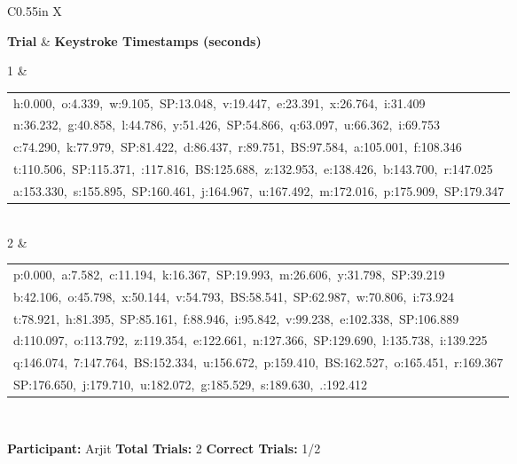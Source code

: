 \documentclass[10pt,a4paper]{article}
\begin{document}
\begin{center}
\begin{tabularx}{\textwidth}{
    C{0.55in}
    X
}
\toprule

\textbf{Trial} &
\textbf{Keystroke Timestamps (seconds)}
\\

\midrule

1 &
\begin{tabular}[t]{@{}l@{}}
h:0.000,\ o:4.339,\ w:9.105,\ SP:13.048,\ v:19.447,\ e:23.391,\ x:26.764,\ i:31.409\\
n:36.232,\ g:40.858,\ l:44.786,\ y:51.426,\ SP:54.866,\ q:63.097,\ u:66.362,\ i:69.753\\
c:74.290,\ k:77.979,\ SP:81.422,\ d:86.437,\ r:89.751,\ BS:97.584,\ a:105.001,\ f:108.346\\
t:110.506,\ SP:115.371,\ 
:117.816,\ BS:125.688,\ z:132.953,\ e:138.426,\ b:143.700,\ r:147.025\\
a:153.330,\ s:155.895,\ SP:160.461,\ j:164.967,\ u:167.492,\ m:172.016,\ p:175.909,\ SP:179.347
\end{tabular}
\\[0.12cm]

2 &
\begin{tabular}[t]{@{}l@{}}
p:0.000,\ a:7.582,\ c:11.194,\ k:16.367,\ SP:19.993,\ m:26.606,\ y:31.798,\ SP:39.219\\
b:42.106,\ o:45.798,\ x:50.144,\ v:54.793,\ BS:58.541,\ SP:62.987,\ w:70.806,\ i:73.924\\
t:78.921,\ h:81.395,\ SP:85.161,\ f:88.946,\ i:95.842,\ v:99.238,\ e:102.338,\ SP:106.889\\
d:110.097,\ o:113.792,\ z:119.354,\ e:122.661,\ n:127.366,\ SP:129.690,\ l:135.738,\ i:139.225\\
q:146.074,\ 7:147.764,\ BS:152.334,\ u:156.672,\ p:159.410,\ BS:162.527,\ o:165.451,\ r:169.367\\
SP:176.650,\ j:179.710,\ u:182.072,\ g:185.529,\ s:189.630,\ .:192.412
\end{tabular}
\\[0.12cm]

\bottomrule
\end{tabularx}
\end{center}

\vfill


\noindent
\textbf{Participant:} Arjit
\hfill
\textbf{Total Trials:} 2
\hfill
\textbf{Correct Trials:} 1/2
\end{document}

